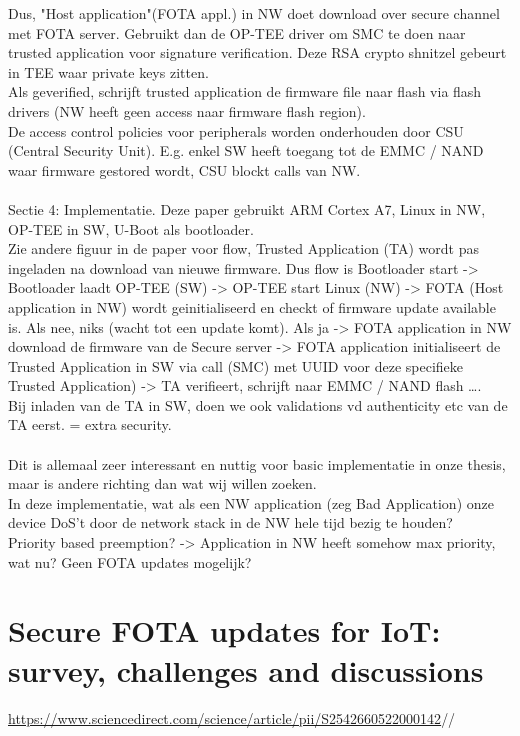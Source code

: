 Dus, "Host application"(FOTA appl.) in NW doet download over secure channel met FOTA server. Gebruikt dan de OP-TEE driver om SMC te doen naar trusted application voor signature verification. Deze RSA crypto shnitzel gebeurt in TEE waar private keys zitten.\\ 
Als geverified, schrijft trusted application de firmware file naar flash via flash drivers (NW heeft geen access naar firmware flash region).\\
De access control policies voor peripherals worden onderhouden door CSU (Central Security Unit). E.g. enkel SW heeft toegang tot de EMMC / NAND waar firmware gestored wordt, CSU blockt calls van NW.\\
\\
Sectie 4: Implementatie. 
Deze paper gebruikt ARM Cortex A7, Linux in NW, OP-TEE in SW, U-Boot als bootloader. \\
Zie andere figuur in de paper voor flow, Trusted Application (TA) wordt pas ingeladen na download van nieuwe firmware. Dus flow is Bootloader start -> Bootloader laadt OP-TEE (SW) -> OP-TEE start Linux (NW) -> FOTA (Host application in NW) wordt geinitialiseerd en checkt of firmware update available is. Als nee, niks (wacht tot een update komt). Als ja -> FOTA application in NW download de firmware van de Secure server -> FOTA application initialiseert de Trusted Application in SW via call (SMC) met UUID voor deze specifieke Trusted Application) -> TA verifieert, schrijft naar EMMC / NAND flash \dots.\\
Bij inladen van de TA in SW, doen we ook validations vd authenticity etc van de TA eerst. = extra security.\\
\\
Dit is allemaal zeer interessant en nuttig voor basic implementatie in onze thesis, maar is andere richting dan wat wij willen zoeken. \\
In deze implementatie, wat als een NW application (zeg Bad Application) onze device DoS't door de network stack in de NW hele tijd bezig te houden?\\
Priority based preemption? -> Application in NW heeft somehow max priority, wat nu? Geen FOTA updates mogelijk?\\
\section{Secure FOTA updates for IoT: survey, challenges and discussions}
\url{https://www.sciencedirect.com/science/article/pii/S2542660522000142}//
